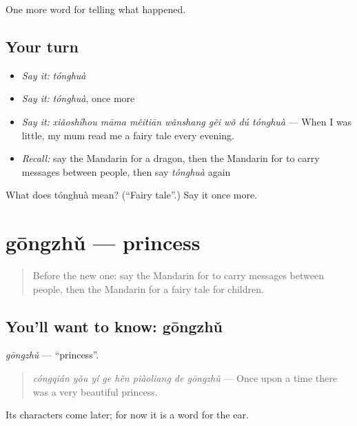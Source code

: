 \begin{grammarlens}[title={What you've built}]
One more word for telling what happened.
\end{grammarlens}

\subsection*{Your turn}
\begin{itemize}
\raggedright
  \item \emph{Say it:} \emph{tónghuà}
  \item \emph{Say it:} \emph{tónghuà}, once more
  \item \emph{Say it:} \emph{xiǎoshíhou māma měitiān wǎnshang gěi wǒ dú tónghuà} — When I was little, my mum read me a fairy tale every evening.
  \item \emph{Recall:} say the Mandarin for a dragon, then the Mandarin for to carry messages between people, then say \emph{tónghuà} again
\end{itemize}

\begin{tcolorbox}[breakable,colback=teal!4,colframe=teal!35!black,title={Before you move on}]
What does tónghuà mean? (\textquotedblleft{}Fairy tale\textquotedblright{}.) Say it once more.
\end{tcolorbox}
\section[gōngzhǔ]{gōngzhǔ — princess}

\label{lesson:ZH-C329-gongzhu}



\begin{quote}
Before the new one: say the Mandarin for to carry messages between people, then the Mandarin for a fairy tale for children.
\end{quote}

\subsection*{You'll want to know: gōngzhǔ}
\emph{gōngzhǔ} — \textquotedblleft{}princess\textquotedblright{}.

\begin{quote}
\emph{cóngqián yǒu yí ge hěn piàoliang de gōngzhǔ} — Once upon a time there was a very beautiful princess.
\end{quote}

Its characters come later; for now it is a word for the ear.

